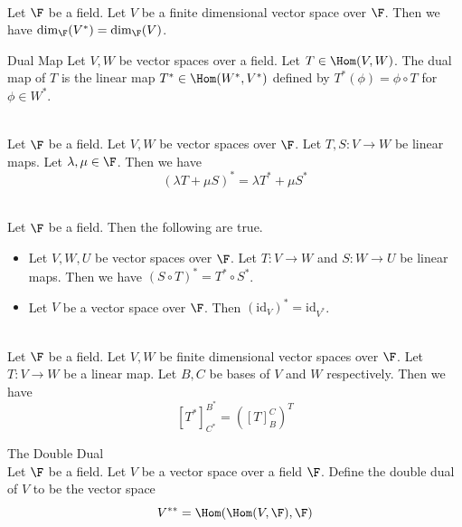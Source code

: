 \documentclass[a4paper]{article}
\begin{document}
\begin{crl}{}{}\\
Let $\F$ be a field. Let $V$ be a finite dimensional vector space over $\F$. Then we have $\dim_\F(V^\ast)=\dim_\F(V)$. 
\end{crl}

\begin{defn}{Dual Map}{} Let $V,W$ be vector spaces over a field. Let $T\in\Hom(V,W)$. The dual map of $T$ is the linear map $T^\ast\in\Hom(W^\ast,V^\ast)$ defined by $T^\ast(\phi)=\phi\circ T$ for $\phi\in W^\ast$. 
\end{defn}

\begin{prp}{}{}\\
Let $\F$ be a field. Let $V,W$ be vector spaces over $\F$. Let $T,S:V\to W$ be linear maps. Let $\lambda,\mu\in\F$. Then we have $$(\lambda T+\mu S)^\ast=\lambda T^\ast+\mu S^\ast$$
\end{prp}

\begin{prp}{}{}\\
Let $\F$ be a field. Then the following are true. 
\begin{itemize}
\item Let $V,W,U$ be vector spaces over $\F$. Let $T:V\to W$ and $S:W\to U$ be linear maps. Then we have $(S\circ T)^\ast=T^\ast\circ S^\ast$. 
\item Let $V$ be a vector space over $\F$. Then $(\text{id}_V)^\ast=\text{id}_{V^\ast}$. 
\end{itemize}
\end{prp}

\begin{prp}{}{}\\
Let $\F$ be a field. Let $V,W$ be finite dimensional vector spaces over $\F$. Let $T:V\to W$ be a linear map. Let $B,C$ be bases of $V$ and $W$ respectively. Then we have $$[T^\ast]_{C^\ast}^{B^\ast}=([T]_B^C)^T$$
\end{prp}

\begin{defn}{The Double Dual}{}\\
Let $\F$ be a field. Let $V$ be a vector space over a field $\F$. Define the double dual of $V$ to be the vector space $$V^{\ast\ast}=\Hom(\Hom(V,\F),\F)$$
\end{defn}
\end{document}
